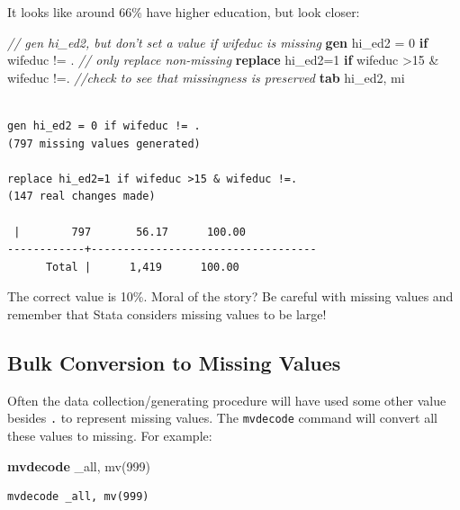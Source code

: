 \documentclass[]{book}
\newenvironment{Shaded}{\begin{snugshade}}{\end{snugshade}}
\newcommand{\CommentTok}[1]{\textcolor[rgb]{0.56,0.35,0.01}{\textit{#1}}}
\newcommand{\DataTypeTok}[1]{\textcolor[rgb]{0.13,0.29,0.53}{#1}}
\newcommand{\FunctionTok}[1]{\textcolor[rgb]{0.00,0.00,0.00}{#1}}
\newcommand{\KeywordTok}[1]{\textcolor[rgb]{0.13,0.29,0.53}{\textbf{#1}}}
\newcommand{\NormalTok}[1]{#1}
\begin{document}
It looks like around 66\% have higher education, but look closer:

\begin{Shaded}
\begin{Highlighting}[]
  \CommentTok{// gen hi_ed2, but don't set a value if wifeduc is missing}
  \KeywordTok{gen}\NormalTok{ hi_ed2 = 0 }\KeywordTok{if}\NormalTok{ wifeduc != . }
  \CommentTok{// only replace non-missing}
  \KeywordTok{replace}\NormalTok{ hi_ed2=1 }\KeywordTok{if}\NormalTok{ wifeduc >15 & wifeduc !=. }
  \CommentTok{//check to see that missingness is preserved}
  \KeywordTok{tab}\NormalTok{ hi_ed2, }\FunctionTok{mi}
\end{Highlighting}
\end{Shaded}

\begin{verbatim}

gen hi_ed2 = 0 if wifeduc != . 
(797 missing values generated)

replace hi_ed2=1 if wifeduc >15 & wifeduc !=. 
(147 real changes made)

 |        797       56.17      100.00
------------+-----------------------------------
      Total |      1,419      100.00
\end{verbatim}

The correct value is 10\%. Moral of the story? Be careful with missing values and remember that Stata considers missing values to be large!

\hypertarget{bulk-conversion-to-missing-values}{%
\subsection{Bulk Conversion to Missing Values}\label{bulk-conversion-to-missing-values}}

Often the data collection/generating procedure will have used some other value besides \texttt{.} to represent missing values. The \texttt{mvdecode} command will convert all these values to missing. For example:

\begin{Shaded}
\begin{Highlighting}[]
  \KeywordTok{mvdecode} \DataTypeTok{_all}\NormalTok{, mv(999)}
\end{Highlighting}
\end{Shaded}

\begin{verbatim}
mvdecode _all, mv(999)
\end{verbatim}
\end{document}
